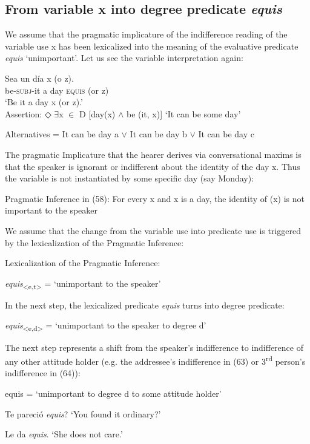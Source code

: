 \documentclass[output=paper
,modfonts
,nonflat]{langsci/langscibook}
\begin{document}
\subsection{From variable x into degree predicate \textit{equis}}\label{sec:kellert:4.1}
We assume that the pragmatic implicature of the indifference reading of the variable use x has been lexicalized into the meaning of the evaluative predicate \textit{equis} ‘unimportant’.  Let us see the variable interpretation again:

\ea
\gll Sea un día x (o z).\\
 be-\textsc{subj}-it a day \textsc{equis} (or z)\\
\glt ‘Be it a day x (or z).’\\
Assertion: ◇ $\exists$x $\in$ D {[}day(x) $\wedge$ be (it, x){]} ‘It can be some day’\par
Alternatives = It can be day a $\vee$ It can be day b $\vee$ It can be day c
\z

The pragmatic Implicature that the hearer derives via conversational maxims is that the speaker is ignorant or indifferent about the identity of the day x. Thus the variable is not instantiated by some specific day (say Monday):

\ea Pragmatic Inference in (58): For every x and x is a day, the identity of (x) is not important to the speaker
\z

We assume that the change from the variable use into predicate use is triggered by the lexicalization of the Pragmatic Inference:

\ea Lexicalization of the Pragmatic Inference:\par
	\textit{equis}\textsubscript{<e,t>} = ‘unimportant to the speaker’
\z

In the next step, the lexicalized predicate \textit{equis} turns into degree predicate:

\ea \textit{equis}\textsubscript{<e,d>} = ‘unimportant to the speaker to degree d’
\z

The next step represents a shift from the speaker’s indifference to  indifference of any other attitude holder (e.g. the addressee’s indifference in (63) or 3\textsuperscript{rd} person’s indifference in (64)):

\ea	equis = ‘unimportant to degree d to some attitude holder’
\z

\ea Te pareció \textit{equis}? ‘You found it ordinary?’
\z

\ea Le da \textit{equis}. ‘She does not care.’
\z
\end{document}
